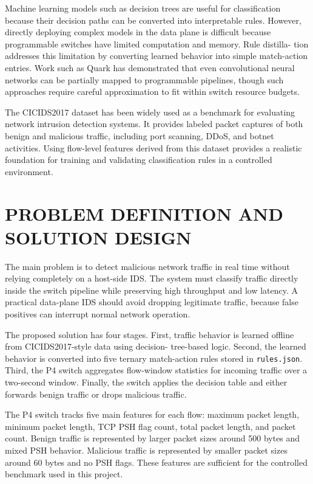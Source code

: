 \documentclass[conference]{IEEEtran}
\begin{document}
Machine learning models such as decision trees are useful
for classification because their decision paths can be converted
into interpretable rules. However, directly deploying complex
models in the data plane is difficult because programmable
switches have limited computation and memory. Rule distilla-
tion addresses this limitation by converting learned behavior
into simple match-action entries. Work such as Quark has
demonstrated that even convolutional neural networks can be
partially mapped to programmable pipelines, though such
approaches require careful approximation to fit within switch
resource budgets.

The CICIDS2017 dataset has been widely used as a
benchmark for evaluating network intrusion detection systems.
It provides labeled packet captures of both benign and
malicious traffic, including port scanning, DDoS, and botnet
activities. Using flow-level features derived from this dataset
provides a realistic foundation for training and validating
classification rules in a controlled environment.

\section{PROBLEM DEFINITION AND SOLUTION DESIGN}

The main problem is to detect malicious network traffic
in real time without relying completely on a host-side IDS.
The system must classify traffic directly inside the switch
pipeline while preserving high throughput and low latency.
A practical data-plane IDS should avoid dropping legitimate
traffic, because false positives can interrupt normal network
operation.

The proposed solution has four stages. First, traffic behavior
is learned offline from CICIDS2017-style data using decision-
tree-based logic. Second, the learned behavior is converted
into five ternary match-action rules stored in \texttt{rules.json}.
Third, the P4 switch aggregates flow-window statistics for
incoming traffic over a two-second window. Finally, the switch
applies the decision table and either forwards benign traffic or
drops malicious traffic.

The P4 switch tracks five main features for each flow:
maximum packet length, minimum packet length, TCP PSH
flag count, total packet length, and packet count. Benign
traffic is represented by larger packet sizes around 500 bytes
and mixed PSH behavior. Malicious traffic is represented by
smaller packet sizes around 60 bytes and no PSH flags. These
features are sufficient for the controlled benchmark used in
this project.
\end{document}
